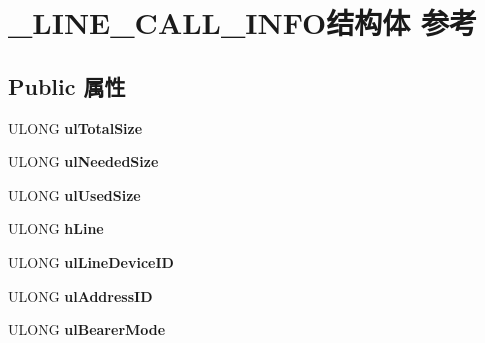 \hypertarget{struct___l_i_n_e___c_a_l_l___i_n_f_o}{}\section{\+\_\+\+L\+I\+N\+E\+\_\+\+C\+A\+L\+L\+\_\+\+I\+N\+F\+O结构体 参考}
\label{struct___l_i_n_e___c_a_l_l___i_n_f_o}
\subsection*{Public 属性}
\begin{DoxyCompactItemize}
\item 
\mbox{\label{struct___l_i_n_e___c_a_l_l___i_n_f_o_ae9efa1c35a637cb3d8ef03a868ef8dc7}} 
U\+L\+O\+NG {\bfseries ul\+Total\+Size}
\item 
\mbox{\label{struct___l_i_n_e___c_a_l_l___i_n_f_o_af51f1d5728e83684f1faa823ff7f4aeb}} 
U\+L\+O\+NG {\bfseries ul\+Needed\+Size}
\item 
\mbox{\label{struct___l_i_n_e___c_a_l_l___i_n_f_o_ac4cf0a25a1a51ffc3901a08e4d19d5c1}} 
U\+L\+O\+NG {\bfseries ul\+Used\+Size}
\item 
\mbox{\label{struct___l_i_n_e___c_a_l_l___i_n_f_o_a39ced1fa6f55fd56bcdeed25bce4ed63}} 
U\+L\+O\+NG {\bfseries h\+Line}
\item 
\mbox{\label{struct___l_i_n_e___c_a_l_l___i_n_f_o_a577acd611ac139fdb06e068a1a61f6e8}} 
U\+L\+O\+NG {\bfseries ul\+Line\+Device\+ID}
\item 
\mbox{\label{struct___l_i_n_e___c_a_l_l___i_n_f_o_a6db3aa512b66d0e0fe5fd1ae05db3f8f}} 
U\+L\+O\+NG {\bfseries ul\+Address\+ID}
\item 
\mbox{\label{struct___l_i_n_e___c_a_l_l___i_n_f_o_a7a77d1ac188951778634ab1dcd1a6dcb}} 
U\+L\+O\+NG {\bfseries ul\+Bearer\+Mode}
\item 
\mbox{\label{struct___l_i_n_e___c_a_l_l___i_n_f_o_a525cfc72dc1f312aa1ca607b4528869a}} 

\end{DoxyCompactItemize}
